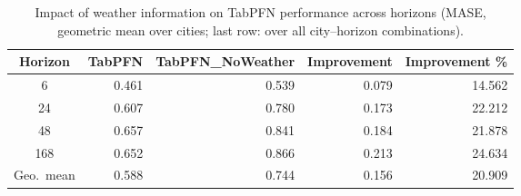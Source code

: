 \begin{table}
\centering
\caption{Impact of weather information on TabPFN performance across horizons (MASE, geometric mean over cities; last row: over all city--horizon combinations).}
\label{tab:tabpfn_weather_cross_city_by_horizon}
\begin{tabular}{crrrr}
\toprule
Horizon & TabPFN & TabPFN\_NoWeather & Improvement & Improvement \% \\
\midrule
6 & 0.461 & 0.539 & 0.079 & 14.562 \\
24 & 0.607 & 0.780 & 0.173 & 22.212 \\
48 & 0.657 & 0.841 & 0.184 & 21.878 \\
168 & 0.652 & 0.866 & 0.213 & 24.634 \\
\midrule
Geo.\ mean & 0.588 & 0.744 & 0.156 & 20.909 \\
\bottomrule
\end{tabular}
\end{table}
